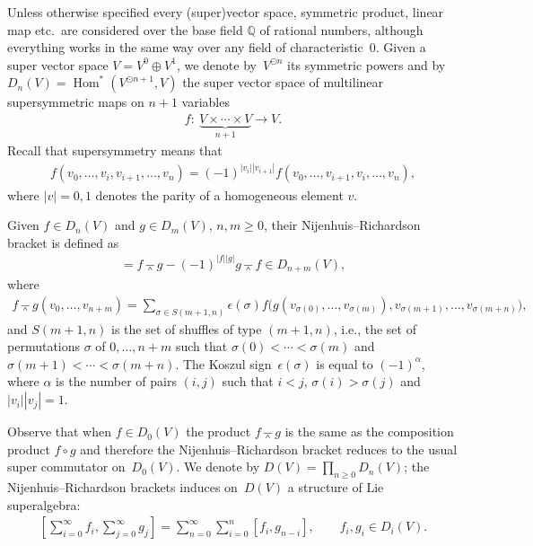 \documentclass[pdftex]{sigma}
\newcommand{\wedgebar}{\barwedge}
\newcommand{\Hom}{\operatorname{Hom}}
\newcommand{\Q}{\mathbb{Q}}
\numberwithin{equation}{section}
\begin{document}
Unless otherwise specif\/ied every (super)vector space, symmetric product, linear map etc.\ are considered over the base f\/ield $\Q$ of rational numbers, although everything works in the same way over any f\/ield of characteristic~0.
Given a super vector space $V=V^{0}\oplus V^{1}$, we denote by~$V^{\odot n}$ its symmetric powers and by
$D_{n}(V)=\Hom^*(V^{\odot n+1},V)$ the super vector space of multilinear supersymmetric maps on $n+1$ variables
\begin{gather*} f\colon \ \underbrace{V\times\cdots\times V}_{n+1}\to V. \end{gather*}
Recall that supersymmetry means that
\begin{gather*} f(v_0,\ldots,v_i,v_{i+1},\ldots,v_n)=(-1)^{|v_i||v_{i+1}|}f(v_0,\ldots,v_{i+1},v_{i},\ldots,v_n),\end{gather*}
where $|v|=0,1$ denotes the parity of a homogeneous element $v$.

Given $f\in D_n(V)$ and $g\in D_m(V)$, $n,m\ge 0$, their Nijenhuis--Richardson bracket \cite{NijRich67} is def\/ined as
\begin{gather*} [f,g]=f\wedgebar g-(-1)^{|f||g|}g\wedgebar f \in D_{n+m}(V),\end{gather*}
where
\begin{gather*} f\wedgebar g
(v_{0},\ldots, v_{n+m})= \sum_{\sigma\in S(m+1,n)}\epsilon(\sigma)
f\big(g(v_{\sigma(0)},\ldots, v_{\sigma(m)}), v_{\sigma(m+1)},\ldots,
v_{\sigma(m+n)}\big),\end{gather*}
and $S(m+1,n)$ is the set of shuf\/f\/les of type $(m+1,n)$, i.e., the set of permutations $\sigma$ of $0,\ldots,n+m$
such that $\sigma(0)<\cdots<\sigma(m)$ and $\sigma(m+1)<\cdots<\sigma(m+n)$. The Koszul sign~$\epsilon(\sigma)$ is equal to $(-1)^{\alpha}$, where $\alpha$ is the number of pairs $(i,j)$ such that $i<j$, $\sigma(i)>\sigma(j)$ and $|v_i||v_j|=1$.

Observe that when $f\in D_0(V)$ the product $f\wedgebar g$ is the same as the composition product $f\circ g$ and therefore
the Nijenhuis--Richardson bracket reduces to the usual super commutator on~$D_0(V)$. We denote by $D(V)=\prod\limits_{n\ge 0}D_n(V)$; the Nijenhuis--Richardson brackets induces on~$D(V)$ a structure of Lie superalgebra:
\begin{gather*} \left[\sum_{i=0}^{\infty}f_i ,\sum_{j= 0}^{\infty}g_j\right]=\sum_{n= 0}^{\infty} \sum_{i=0}^n [f_i,g_{n-i}],\qquad f_i,g_i\in D_i(V) .\end{gather*}
\end{document}
